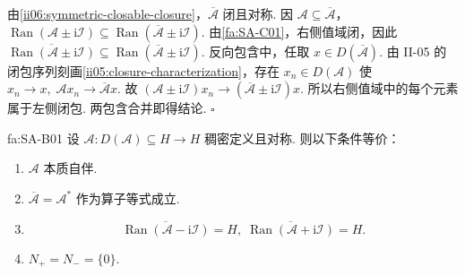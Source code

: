 \begin{FAProof}
由\autoref{ii06:symmetric-closable-closure}，\(\displaystyle\overline{\mathcal A}\) 闭且对称. 因 \(\displaystyle\mathcal A\subseteq\overline{\mathcal A}\)，
\(\displaystyle \operatorname{Ran}(\mathcal A\pm\mathrm{i}\mathcal I) \subseteq \operatorname{Ran}(\overline{\mathcal A}\pm\mathrm{i}\mathcal I).\)
由\autoref{fa:SA-C01}，右侧值域闭，因此
\(\displaystyle \overline{\operatorname{Ran}(\mathcal A\pm\mathrm{i}\mathcal I)} \subseteq \operatorname{Ran}(\overline{\mathcal A}\pm\mathrm{i}\mathcal I).\)
反向包含中，任取 \(\displaystyle x\in D(\overline{\mathcal A})\). 由 II-05 的闭包序列刻画\autoref{ii05:closure-characterization}，存在 \(\displaystyle x_n\in D(\mathcal A)\) 使
\(\displaystyle x_n\to x,\; \mathcal Ax_n\to\overline{\mathcal A}x.\)
故
\(\displaystyle (\mathcal A\pm\mathrm{i}\mathcal I)x_n \longrightarrow (\overline{\mathcal A}\pm\mathrm{i}\mathcal I)x.\)
所以右侧值域中的每个元素属于左侧闭包. 两包含合并即得结论.
\hfill\(\square\)
\end{FAProof}

\begin{FATheorem}{fa:SA-B01}
设 \(\displaystyle\mathcal A:D(\mathcal A)\subseteq H\to H\) 稠密定义且对称. 则以下条件等价：
\begin{enumerate}[label=\textnormal{(\roman*)}]
\item \(\displaystyle\mathcal A\) 本质自伴.
\item \(\displaystyle\overline{\mathcal A}=\mathcal A^*\) 作为算子等式成立.
\item
\[
\overline{\operatorname{Ran}(\mathcal A-\mathrm{i}\mathcal I)}=H,
\;
\overline{\operatorname{Ran}(\mathcal A+\mathrm{i}\mathcal I)}=H.
\]
\item \(\displaystyle N_+=N_-=\{0\}\).
\end{enumerate}
\end{FATheorem}

